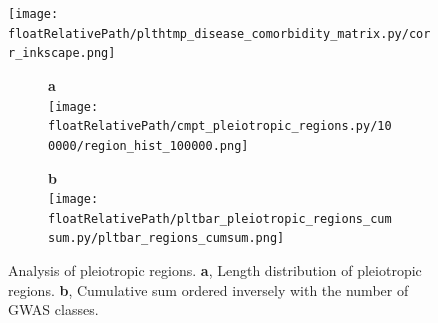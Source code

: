 %
%

\begin{figure}[!ht]
    \centering
    \texttt{[image: \\floatRelativePath/plthtmp\_disease\_comorbidity\_matrix.py/corr\_inkscape.png]}
    \caption{}
\end{figure}

%
%

 \begin{figure}[!tbp]
 \centering
 \begin{subfigure}[]{.33\textwidth}
 \textbf{a}
 \\
 \texttt{[image: \\floatRelativePath/cmpt\_pleiotropic\_regions.py/100000/region\_hist\_100000.png]}
 \end{subfigure}
 \begin{subfigure}[]{.33\textwidth}
 \textbf{b}
 \\
 \texttt{[image: \\floatRelativePath/pltbar\_pleiotropic\_regions\_cumsum.py/pltbar\_regions\_cumsum.png]}
 \end{subfigure}
 \caption{Analysis of pleiotropic regions. \textbf{a}, Length distribution of pleiotropic regions. \textbf{b}, Cumulative sum ordered inversely with the number of GWAS classes.} \label{fig:pleiotropy_region_distribution}
 \end{figure}

%
%

